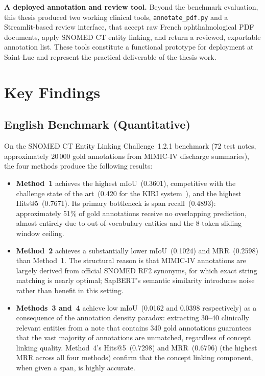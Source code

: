 \textbf{A deployed annotation and review tool.} Beyond the benchmark evaluation, this thesis produced two working clinical tools, \texttt{annotate\_pdf.py} and a Streamlit-based review interface, that accept raw French ophthalmological PDF documents, apply SNOMED CT entity linking, and return a reviewed, exportable annotation list. These tools constitute a functional prototype for deployment at Saint-Luc and represent the practical deliverable of the thesis work.

\section{Key Findings}

\subsection{English Benchmark (Quantitative)}

On the SNOMED CT Entity Linking Challenge~1.2.1 benchmark (72 test notes, approximately 20\,000 gold annotations from MIMIC-IV discharge summaries), the four methods produce the following results:

\begin{itemize}
    \item \textbf{Method~1} achieves the highest mIoU~(0.3601), competitive with the challenge state of the art~(0.420 for the KIRI system~\cite{Davidson:2025}), and the highest Hits@5~(0.7671). Its primary bottleneck is span recall~(0.4893): approximately 51\% of gold annotations receive no overlapping prediction, almost entirely due to out-of-vocabulary entities and the 8-token sliding window ceiling.

    \item \textbf{Method~2} achieves a substantially lower mIoU~(0.1024) and MRR~(0.2598) than Method~1. The structural reason is that MIMIC-IV annotations are largely derived from official SNOMED RF2 synonyms, for which exact string matching is nearly optimal; SapBERT's semantic similarity introduces noise rather than benefit in this setting.

    \item \textbf{Methods~3 and~4} achieve low mIoU~(0.0162 and 0.0398 respectively) as a consequence of the annotation density paradox: extracting 30--40 clinically relevant entities from a note that contains 340 gold annotations guarantees that the vast majority of annotations are unmatched, regardless of concept linking quality. Method~4's Hits@5~(0.7298) and MRR~(0.6796) (the highest MRR across all four methods) confirm that the concept linking component, when given a span, is highly accurate.
\end{itemize}

